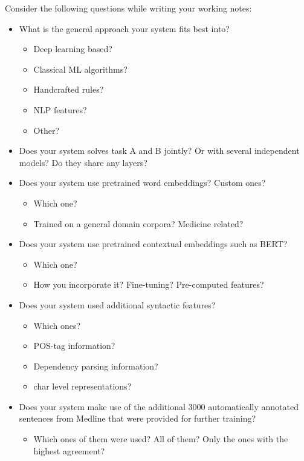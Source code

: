 \documentclass[]{llncs}
\begin{document}
Consider the following questions while writing your working notes:

\begin{itemize}
    \item What is the general approach your system fits best into?
        \begin{itemize}
            \item Deep learning based?
            \item Classical ML algorithms?
            \item Handcrafted rules?
            \item NLP features?
            \item Other?
        \end{itemize} 
    \item Does your system solves task A and B jointly? Or with several independent models? Do they share any layers?
    \item Does your system use pretrained word embeddings? Custom ones?
        \begin{itemize}
            \item Which one?
            \item Trained on a general domain corpora? Medicine related?
        \end{itemize}
    \item Does your system use pretrained contextual embeddings such as BERT?
        \begin{itemize}
            \item Which one?
            \item How you incorporate it? Fine-tuning? Pre-computed features?
        \end{itemize}
    \item Does your system used additional syntactic features?
        \begin{itemize}
            \item Which ones?
            \item POS-tag information?
            \item Dependency parsing information?
            \item char level representations?
        \end{itemize}
    \item Does your system make use of the additional 3000 automatically annotated sentences from Medline that were provided for further training?
        \begin{itemize}
            \item Which ones of them were used? All of them? Only the ones with the highest agreement?

\end{itemize}
\end{itemize}
\end{document}
